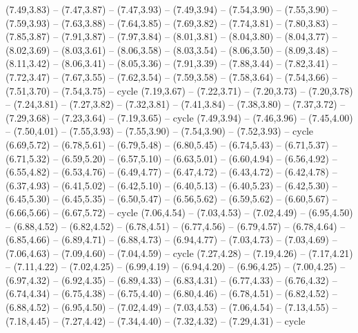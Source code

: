 \expandafter\def\csname geo:gebiet:IRN\endcsname{
  (7.49,3.83) -- (7.47,3.87) -- (7.47,3.93) -- (7.49,3.94) -- (7.54,3.90) -- (7.55,3.90) -- (7.59,3.93) -- (7.63,3.88) -- (7.64,3.85) -- (7.69,3.82) -- (7.74,3.81) -- (7.80,3.83) -- (7.85,3.87) -- (7.91,3.87) -- (7.97,3.84) -- (8.01,3.81) -- (8.04,3.80) -- (8.04,3.77) -- (8.02,3.69) -- (8.03,3.61) -- (8.06,3.58) -- (8.03,3.54) -- (8.06,3.50) -- (8.09,3.48) -- (8.11,3.42) -- (8.06,3.41) -- (8.05,3.36) -- (7.91,3.39) -- (7.88,3.44) -- (7.82,3.41) -- (7.72,3.47) -- (7.67,3.55) -- (7.62,3.54) -- (7.59,3.58) -- (7.58,3.64) -- (7.54,3.66) -- (7.51,3.70) -- (7.54,3.75) -- cycle}
\expandafter\def\csname geo:gebiet:SYR\endcsname{
  (7.19,3.67) -- (7.22,3.71) -- (7.20,3.73) -- (7.20,3.78) -- (7.24,3.81) -- (7.27,3.82) -- (7.32,3.81) -- (7.41,3.84) -- (7.38,3.80) -- (7.37,3.72) -- (7.29,3.68) -- (7.23,3.64) -- (7.19,3.65) -- cycle}
\expandafter\def\csname geo:gebiet:ARM\endcsname{
  (7.49,3.94) -- (7.46,3.96) -- (7.45,4.00) -- (7.50,4.01) -- (7.55,3.93) -- (7.55,3.90) -- (7.54,3.90) -- (7.52,3.93) -- cycle}
\expandafter\def\csname geo:gebiet:SWE\endcsname{
  (6.69,5.72) -- (6.78,5.61) -- (6.79,5.48) -- (6.80,5.45) -- (6.74,5.43) -- (6.71,5.37) -- (6.71,5.32) -- (6.59,5.20) -- (6.57,5.10) -- (6.63,5.01) -- (6.60,4.94) -- (6.56,4.92) -- (6.55,4.82) -- (6.53,4.76) -- (6.49,4.77) -- (6.47,4.72) -- (6.43,4.72) -- (6.42,4.78) -- (6.37,4.93) -- (6.41,5.02) -- (6.42,5.10) -- (6.40,5.13) -- (6.40,5.23) -- (6.42,5.30) -- (6.45,5.30) -- (6.45,5.35) -- (6.50,5.47) -- (6.56,5.62) -- (6.59,5.62) -- (6.60,5.67) -- (6.66,5.66) -- (6.67,5.72) -- cycle}
\expandafter\def\csname geo:gebiet:BLR\endcsname{
  (7.06,4.54) -- (7.03,4.53) -- (7.02,4.49) -- (6.95,4.50) -- (6.88,4.52) -- (6.82,4.52) -- (6.78,4.51) -- (6.77,4.56) -- (6.79,4.57) -- (6.78,4.64) -- (6.85,4.66) -- (6.89,4.71) -- (6.88,4.73) -- (6.94,4.77) -- (7.03,4.73) -- (7.03,4.69) -- (7.06,4.63) -- (7.09,4.60) -- (7.04,4.59) -- cycle}
\expandafter\def\csname geo:gebiet:UKR\endcsname{
  (7.27,4.28) -- (7.19,4.26) -- (7.17,4.21) -- (7.11,4.22) -- (7.02,4.25) -- (6.99,4.19) -- (6.94,4.20) -- (6.96,4.25) -- (7.00,4.25) -- (6.97,4.32) -- (6.92,4.35) -- (6.89,4.33) -- (6.83,4.31) -- (6.77,4.33) -- (6.76,4.32) -- (6.74,4.34) -- (6.75,4.38) -- (6.75,4.40) -- (6.80,4.46) -- (6.78,4.51) -- (6.82,4.52) -- (6.88,4.52) -- (6.95,4.50) -- (7.02,4.49) -- (7.03,4.53) -- (7.06,4.54) -- (7.13,4.55) -- (7.18,4.45) -- (7.27,4.42) -- (7.34,4.40) -- (7.32,4.32) -- (7.29,4.31) -- cycle}
